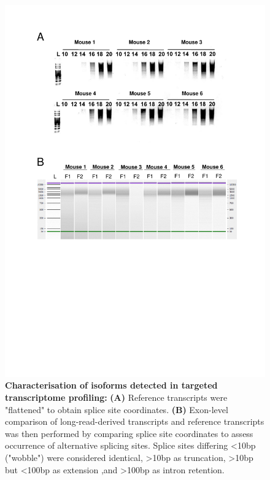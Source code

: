 \begin{figure}[htp]
	\centering
	\includegraphics[page=7,trim={0cm 5cm 0cm 0cm},clip,scale = 0.75]{Figures/TargetedTranscriptome_LabResults}
	\captionsetup{width=0.95\textwidth,singlelinecheck=off}
	\caption[Characterisation of isoforms detected in targeted transcriptome profiling]%
	{\textbf{Characterisation of isoforms detected in targeted transcriptome profiling:} \textbf{(A)} Reference transcripts were "flattened" to obtain splice site coordinates. \textbf{(B)} Exon-level comparison of long-read-derived transcripts and reference transcripts was then performed by comparing splice site coordinates to assess occurrence of alternative splicing sites. Splice sites differing <10bp ("wobble") were considered identical, >10bp as truncation, >10bp but <100bp as extension ,and >100bp as intron retention.  
	}
	\label{fig:Targeted_isoforms_annotate}
\end{figure}

